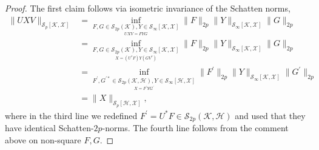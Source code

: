 \documentclass[11pt]{article}
\newcommand{\1}{\ensuremath{\mathbbm{1}}}
\theoremstyle{newdefinition}
\theoremstyle{newplain}
\theoremstyle{myplain}
\begin{document}
\begin{proof}
The first claim follows via isometric invariance of the Schatten norms,
\begin{align}
\|UXV\|_{\mathcal{S}_p[\mathcal{K},\mathcal{X}]} &= \inf_{\underset{UXV=FYG}{F,G\in \mathcal{S}_{2p}(\mathcal{K}), Y\in \mathcal{S}_\infty[\mathcal{K},\mathcal{X}]}}\|F\|_{2p}\|Y\|_{\mathcal{S}_\infty[\mathcal{K},\mathcal{X}]}\|G\|_{2p} \\ &= \inf_{\underset{X=(U^*F)Y(GV^*)}{F,G\in \mathcal{S}_{2p}(\mathcal{K}), Y\in \mathcal{S}_\infty[\mathcal{K},\mathcal{X}]}}\|F\|_{2p}\|Y\|_{\mathcal{S}_\infty[\mathcal{K},\mathcal{X}]}\|G\|_{2p}  \\ &= \inf_{\underset{X=F^\prime YG^\prime}{F^\prime,G^{\prime*}\in \mathcal{S}_{2p}(\mathcal{K},\mathcal{H}), Y\in \mathcal{S}_\infty[\mathcal{H},\mathcal{X}]}}\|F^\prime\|_{2p}\|Y\|_{\mathcal{S}_\infty[\mathcal{K},\mathcal{X}]}\|G^\prime\|_{2p} \\ 
 &= \|X\|_{\mathcal{S}_p[\mathcal{H},\mathcal{X}]},
\end{align} where in the third line we redefined $F^\prime=U^*F\in\mathcal{S}_{2p}(\mathcal{K},\mathcal{H})$ and used that they have identical Schatten-$2p$-norms. The fourth line follows from the comment above on non-square $F,G$.

\medskip


\end{proof}
\end{document}
